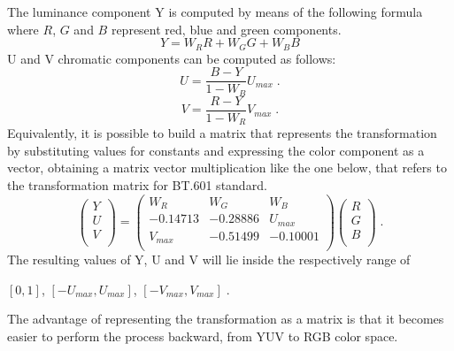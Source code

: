 \documentclass[12pt,a4paper]{extarticle}
\begin{document}
The luminance component Y is computed by means of the following formula where $R$, $G$ and $B$ represent red, blue and green components.
\[Y = W_{R}R + W_{G}G + W_{B}B\]
U and V chromatic components can be computed as follows:
\[U = \frac{B-Y}{1-W_{B}} U_{max} \;.\]
\[V =\frac{R-Y}{1-W_{R}} V_{max} \;.\]
Equivalently, it is possible to build a matrix that represents the transformation by substituting values for constants and expressing the color component as a vector, obtaining a matrix vector multiplication like the one below, that refers to the transformation matrix for BT.601 standard.
\[
\begin{pmatrix}
Y\\
U\\
V\\
\end{pmatrix}
=
\begin{pmatrix}
W_{R} & W_{G} & W_{B}\\
-0.14713 & -0.28886 & U_{max}\\
V_{max} & -0.51499 & -0.10001\\
\end{pmatrix}
\begin{pmatrix}
R\\
G\\
B\\
\end{pmatrix}
\;.
\]
The resulting values of Y, U and V will lie inside the respectively range of 
\begin{center}
$[0,1]$, $[-U_{max},U_{max}]$, $[-V_{max},V_{max}] \;.$
\end{center}


The advantage of representing the transformation as a matrix is that it becomes easier to perform the process backward, from YUV to RGB color space.
\end{document}
